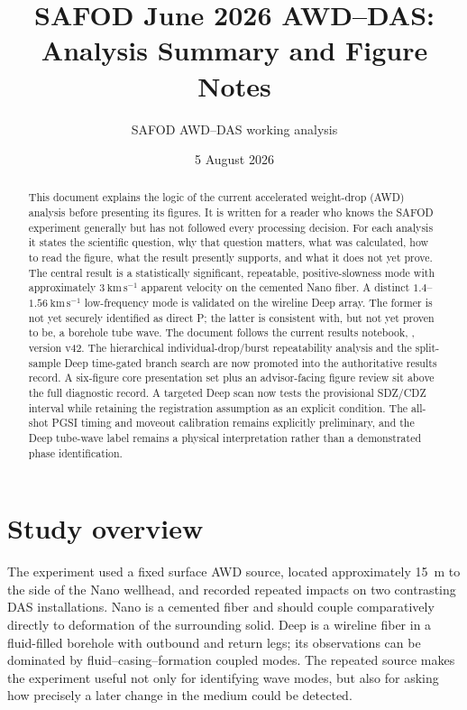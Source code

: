 \documentclass[11pt]{article}
\title{SAFOD June 2026 AWD--DAS: Analysis Summary and Figure Notes}
\author{SAFOD AWD--DAS working analysis}
\date{5 August 2026}
\begin{document}
\maketitle

\begin{abstract}
This document explains the logic of the current accelerated weight-drop (AWD)
analysis before presenting its figures.  It is written for a reader who knows
the SAFOD experiment generally but has not followed every processing decision.
For each analysis it states the scientific question, why that question matters,
what was calculated, how to read the figure, what the result presently supports,
and what it does not yet prove.  The central result is a statistically
significant, repeatable, positive-slowness mode with approximately
$3~\mathrm{km\,s^{-1}}$ apparent velocity on the cemented Nano fiber.  A distinct
$1.4$--$1.56~\mathrm{km\,s^{-1}}$ low-frequency mode is validated on the
wireline Deep array.  The former is not yet securely identified as direct P;
the latter is consistent with, but not yet proven to be, a borehole tube wave.
The document follows the current results notebook,
, version v42.  The hierarchical
individual-drop/burst repeatability analysis and the split-sample Deep
time-gated branch search are now promoted into the authoritative results
record.  A six-figure core presentation set plus an advisor-facing figure
review sit above the full diagnostic record.  A targeted Deep scan now tests
the provisional SDZ/CDZ interval while retaining the registration assumption
as an explicit condition.  The all-shot PGSI timing and moveout calibration
remains explicitly preliminary, and the Deep tube-wave label remains a
physical interpretation rather than a demonstrated phase identification.
\end{abstract}

\tableofcontents
\clearpage

\section{Study overview}

The experiment used a fixed surface AWD source, located approximately 15~m to
the side of the Nano wellhead, and recorded repeated impacts on two contrasting
DAS installations.  Nano is a cemented fiber and should couple comparatively
directly to deformation of the surrounding solid.  Deep is a wireline fiber in
a fluid-filled borehole with outbound and return legs; its observations can be
dominated by fluid--casing--formation coupled modes.  The repeated source makes
the experiment useful not only for identifying wave modes, but also for asking
how precisely a later change in the medium could be detected.
\end{document}
